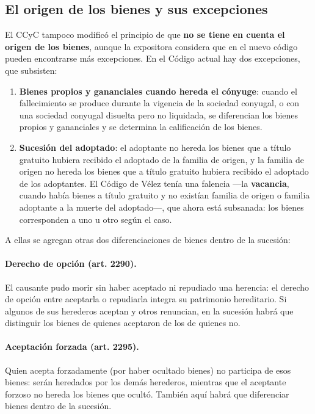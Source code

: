 \documentclass[12pt,oneside]{book}
\begin{document}
\subsection{El origen de los bienes y sus excepciones}

El CCyC tampoco modificó el principio de que \textbf{no se tiene en cuenta el origen de los bienes}, aunque la expositora considera que en el nuevo código pueden encontrarse más excepciones. En el Código actual hay dos excepciones, que subsisten:

\begin{enumerate}
    \item \textbf{Bienes propios y gananciales cuando hereda el cónyuge}: cuando el fallecimiento se produce durante la vigencia de la sociedad conyugal, o con una sociedad conyugal disuelta pero no liquidada, se diferencian los bienes propios y gananciales y se determina la calificación de los bienes.
    \item \textbf{Sucesión del adoptado}: el adoptante no hereda los bienes que a título gratuito hubiera recibido el adoptado de la familia de origen, y la familia de origen no hereda los bienes que a título gratuito hubiera recibido el adoptado de los adoptantes. El Código de Vélez tenía una falencia ---la \textbf{vacancia}, cuando había bienes a título gratuito y no existían familia de origen o familia adoptante a la muerte del adoptado---, que ahora está subsanada: los bienes corresponden a uno u otro según el caso.
\end{enumerate}

A ellas se agregan otras dos diferenciaciones de bienes dentro de la sucesión:

\paragraph{Derecho de opción (art. 2290).} El causante pudo morir sin haber aceptado ni repudiado una herencia: el derecho de opción entre aceptarla o repudiarla integra su patrimonio hereditario. Si algunos de sus herederos aceptan y otros renuncian, en la sucesión habrá que distinguir los bienes de quienes aceptaron de los de quienes no.

\paragraph{Aceptación forzada (art. 2295).} Quien acepta forzadamente (por haber ocultado bienes) no participa de esos bienes: serán heredados por los demás herederos, mientras que el aceptante forzoso no hereda los bienes que ocultó. También aquí habrá que diferenciar bienes dentro de la sucesión.
\end{document}
